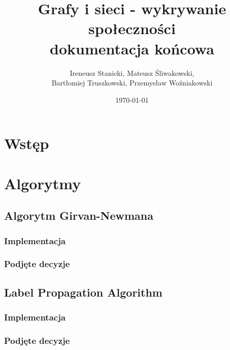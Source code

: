\documentclass{article}
\title{Grafy i sieci - wykrywanie społeczności\\dokumentacja końcowa}
\date{\today}
\author{Ireneusz Stanicki, Mateusz Śliwakowski,\\Bartłomiej Truszkowski, Przemysław Woźniakowski}
\begin{document}
	\begin{titlingpage}
		\maketitle
	\end{titlingpage}

\tableofcontents
\newpage

\section{Wstęp}

\section{Algorytmy}

\subsection{Algorytm Girvan-Newmana}
\subsubsection{Implementacja}
\subsubsection{Podjęte decyzje}

\subsection{Label Propagation Algorithm}
\subsubsection{Implementacja}
\subsubsection{Podjęte decyzje}

\end{document}
